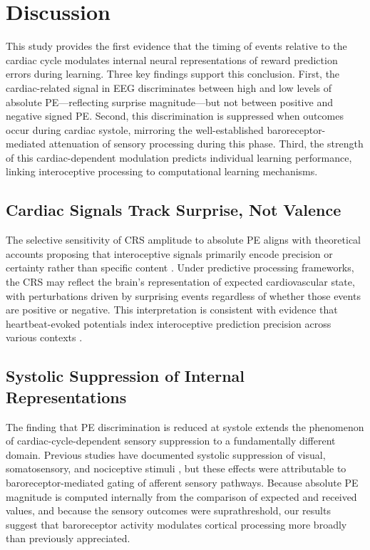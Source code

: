 \documentclass[12pt]{article}
\begin{document}
\section{Discussion}

This study provides the first evidence that the timing of events relative to the cardiac cycle modulates internal neural representations of reward prediction errors during learning. Three key findings support this conclusion. First, the cardiac-related signal in EEG discriminates between high and low levels of absolute PE---reflecting surprise magnitude---but not between positive and negative signed PE. Second, this discrimination is suppressed when outcomes occur during cardiac systole, mirroring the well-established baroreceptor-mediated attenuation of sensory processing during this phase. Third, the strength of this cardiac-dependent modulation predicts individual learning performance, linking interoceptive processing to computational learning mechanisms.

\subsection{Cardiac Signals Track Surprise, Not Valence}

The selective sensitivity of CRS amplitude to absolute PE aligns with theoretical accounts proposing that interoceptive signals primarily encode precision or certainty rather than specific content \citep{seth2013interoceptive, barrett2015interoceptive}. Under predictive processing frameworks, the CRS may reflect the brain's representation of expected cardiovascular state, with perturbations driven by surprising events regardless of whether those events are positive or negative. This interpretation is consistent with evidence that heartbeat-evoked potentials index interoceptive prediction precision across various contexts \citep{marshall2018heartbeat, ainley2016heartfelt}.

\subsection{Systolic Suppression of Internal Representations}

The finding that PE discrimination is reduced at systole extends the phenomenon of cardiac-cycle-dependent sensory suppression to a fundamentally different domain. Previous studies have documented systolic suppression of visual, somatosensory, and nociceptive stimuli \citep{edwards2009sensory, salomon2016brain, park2014peripheral}, but these effects were attributable to baroreceptor-mediated gating of afferent sensory pathways. Because absolute PE magnitude is computed internally from the comparison of expected and received values, and because the sensory outcomes were suprathreshold, our results suggest that baroreceptor activity modulates cortical processing more broadly than previously appreciated.
\end{document}
